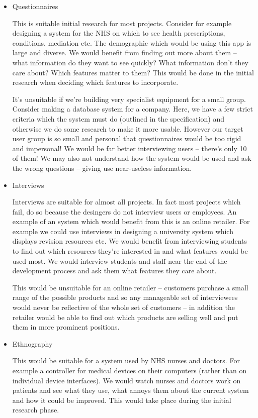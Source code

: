 \documentclass[10pt,\jkfside,a4paper]{article}
\begin{document}
\begin{itemize}

\item Questionnaires

This is suitable initial research for most projects. Consider for example designing a system for the NHS on which to
see health prescriptions, conditions, mediation etc. The demographic which would be using this app is large and
diverse. We would benefit from finding out more about them -- what information do they want to see quickly? What
information don't they care about? Which features matter to them? This would be done in the initial research when
deciding which features to incorporate.

It's unsuitable if we're building very specialist equipment for a small group. Consider making a database system for
a company. Here, we have a few strict criteria which the system must do (outlined in the specification) and
otherwise we do some research to make it more usable. However our target user group is so small and personal that
questionnaires would be too rigid and impersonal! We would be far better interviewing users -- there's only 10 of
them! We may also not understand how the system would be used and ask the wrong questions -- giving use near-useless
information.

\item Interviews

Interviews are suitable for almost all projects. In fact most projects which fail, do so because the desingers do not
interview users or employees. An example of an system which would benefit from this is an online retailer. For
example we could use interviews in designing a university system which displays revision resources etc. We would
benefit from interviewing students to find out which resources they're interested in and what features would be used
most. We would interview students and staff near the end of the development process and ask them what features they
care about.

This would be unsuitable for an online retailer -- customers purchase a small range of the possible products and so
any manageable set of interviewees would never be reflective of the whole set of customers -- in addition the
retailer would be able to find out which products are selling well and put them in more prominent positions.

\item Ethnography

This would be suitable for a system used by NHS nurses and doctors. For example a controller for medical
devices on their computers (rather than on individual device interfaces). We would watch nurses and doctors work on
patients and see what they use, what annoys them about the current system and how it could be improved. This would
take place during the initial research phase.


\end{itemize}
\end{document}
